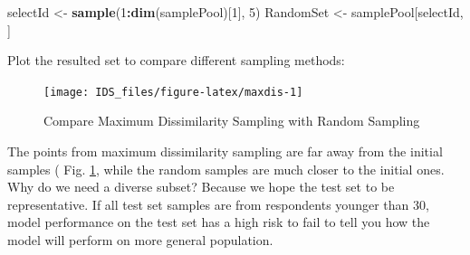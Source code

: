 \documentclass[12pt,]{krantz}
\makeatletter
\newenvironment{Shaded}{\begin{snugshade}}{\end{snugshade}}
\newcommand{\DataTypeTok}[1]{\textcolor[rgb]{0.27,0.27,0.27}{#1}}
\newcommand{\DecValTok}[1]{\textcolor[rgb]{0.06,0.06,0.06}{#1}}
\newcommand{\KeywordTok}[1]{\textcolor[rgb]{0.27,0.27,0.27}{\textbf{#1}}}
\newcommand{\NormalTok}[1]{#1}
\newcommand{\OperatorTok}[1]{\textcolor[rgb]{0.43,0.43,0.43}{\textbf{#1}}}
\newcommand{\OtherTok}[1]{\textcolor[rgb]{0.37,0.37,0.37}{#1}}
\newcommand{\StringTok}[1]{\textcolor[rgb]{0.5,0.5,0.5}{#1}}
\newenvironment{kframe}{%
\medskip{}
\setlength{\fboxsep}{.8em}
 \def\at@end@of@kframe{}%
 \ifinner\ifhmode%
  \def\at@end@of@kframe{\end{minipage}}%
  \begin{minipage}{\columnwidth}%
 \fi\fi%
 \def\FrameCommand##1{\hskip\@totalleftmargin \hskip-\fboxsep
 \colorbox{shadecolor}{##1}\hskip-\fboxsep
     \hskip-\linewidth \hskip-\@totalleftmargin \hskip\columnwidth}%
 \MakeFramed {\advance\hsize-\width
   \@totalleftmargin\z@ \linewidth\hsize
   \@setminipage}}%
 {\par\unskip\endMakeFramed%
 \at@end@of@kframe}
\renewenvironment{Shaded}{\begin{kframe}}{\end{kframe}}
\makeatother
\begin{document}
\begin{Shaded}
\begin{Highlighting}[]
\NormalTok{selectId <-}\StringTok{ }\KeywordTok{sample}\NormalTok{(}\DecValTok{1}\OperatorTok{:}\KeywordTok{dim}\NormalTok{(samplePool)[}\DecValTok{1}\NormalTok{], }\DecValTok{5}\NormalTok{)}
\NormalTok{RandomSet <-}\StringTok{ }\NormalTok{samplePool[selectId, ]}
\end{Highlighting}
\end{Shaded}

Plot the resulted set to compare different sampling methods:

\begin{Shaded}
\end{Shaded}

\begin{figure}

{\centering \texttt{[image: IDS\_files/figure-latex/maxdis-1]} 

}

\caption{Compare Maximum Dissimilarity Sampling with  Random Sampling}\label{fig:maxdis}
\end{figure}

The points from maximum dissimilarity sampling are far away from the initial samples ( Fig. \ref{fig:maxdis}, while the random samples are much closer to the initial ones. Why do we need a diverse subset? Because we hope the test set to be representative. If all test set samples are from respondents younger than 30, model performance on the test set has a high risk to fail to tell you how the model will perform on more general population.
\end{document}
